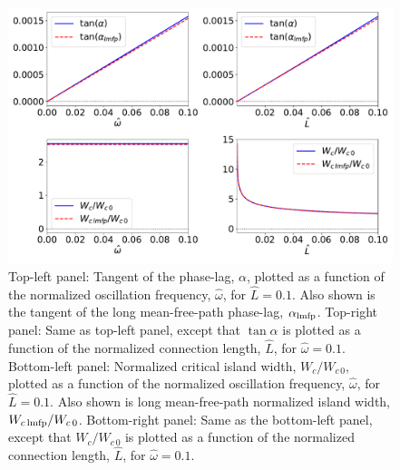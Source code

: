 \documentclass[12pt,prb,aps]{revtex4-1}
\begin{document}
\begin{figure}
\centerline{\includegraphics[width=1.0\textwidth]{lmfp.pdf}}
\caption{Top-left panel: Tangent of the phase-lag, $\alpha$, plotted as a function of the normalized oscillation frequency, $\hat{\omega}$, for  $\hat{L}=0.1$. Also
shown is the tangent of the long mean-free-path phase-lag, $\alpha_{\rm lmfp}$. Top-right panel: Same as top-left panel, except that
$\tan\alpha$ is plotted as a function of the normalized 
connection length, $\hat{L}$, for  $\hat{\omega}=0.1$.
Bottom-left panel: Normalized critical island width, $W_c/W_{c\,0}$,  plotted as a function of the normalized oscillation frequency, $\hat{\omega}$, for  $\hat{L}=0.1$. Also
shown is  long mean-free-path normalized island width, $W_{c\,{\rm lmfp}}/W_{c\,0}$.  
Bottom-right panel: Same as the bottom-left panel, except that $W_c/W_{c\,0}$ is plotted as a function of the normalized 
connection length, $\hat{L}$, for  $\hat{\omega}=0.1$.
  \label{fig5}}
\end{figure}
\end{document}
